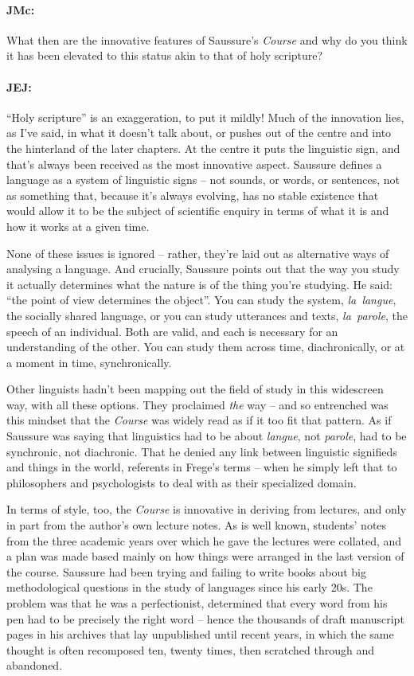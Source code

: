 \documentclass[output=paper]{langscibook}
\begin{document}
\paragraph*{JMc:}  What then are the innovative features of Saussure’s \textit{Course} and why do you think it has  been elevated to this status akin to that of holy scripture?


\paragraph*{JEJ:}  “Holy scripture” is an exaggeration, to put it mildly! Much of the innovation lies, as I’ve said, in what it doesn’t talk about, or pushes out of the centre and into the hinterland of the later chapters. At the centre it puts the linguistic sign, and that’s always been received as the most innovative aspect. Saussure defines a language as a system of linguistic signs – not sounds, or words, or sentences, not as something that, because it’s always evolving, has no stable existence that would allow it to be the subject of scientific enquiry in terms of what it is and how it works at a given time.

None of these issues is ignored – rather, they’re laid out as alternative ways of analysing a language. And crucially, Saussure points out that the way you study it actually determines what the nature is of the thing you’re studying. He said: “the point of view determines the object”. You can study the system, \textit{la~langue}, the socially shared language, or you can study utterances and texts, \textit{la~parole}, the speech of an individual. Both are valid, and each is necessary for an understanding of the other. You can study them across time, diachronically, or at a moment in time, synchronically. 

Other linguists hadn’t been mapping out the field of study in this widescreen way, with all these options. They proclaimed \textit{the} way – and so entrenched was this mindset that the \textit{Course} was widely read as if it too fit that pattern. As if Saussure was saying that linguistics had to be about \textit{langue}, not \textit{parole}, had to be synchronic, not diachronic. That he denied any link between linguistic signifieds and things in the world, referents in Frege’s terms – when he simply left that to philosophers and psychologists to deal with as their specialized domain. 

In terms of style, too, the \textit{Course} is innovative in deriving from lectures, and only in part from the author’s own lecture notes. As is well known, students’ notes from the three academic years over which he gave the lectures were collated, and a plan was made based mainly on how things were arranged in the last version of the course. Saussure had been trying and failing to write books about big methodological questions in the study of languages since his early 20s. The problem was that he was a perfectionist, determined that every word from his pen had to be precisely the right word – hence the thousands of draft manuscript pages in his archives that lay unpublished until recent years, in which the same thought is often recomposed ten, twenty times, then scratched through and abandoned. 
\end{document}
